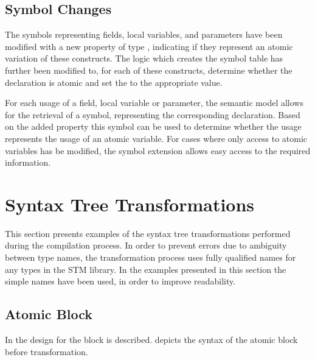 \subsection{Symbol Changes}
The symbols representing fields, local variables, and parameters have been modified with a new  property of type , indicating if they represent an atomic variation of these constructs. The logic which creates the symbol table has further been modified to, for each of these constructs, determine whether the declaration is atomic and set the  to the appropriate value.

For each usage of a field, local variable or parameter, the semantic model allows for the retrieval of a symbol, representing the corresponding declaration. Based on the added  property this symbol can be used to determine whether the usage represents the usage of an atomic variable. For cases where only access to atomic variables has be modified, the symbol extension allows easy access to the required information.

\section{Syntax Tree Transformations}
\label{sec:syntax_tree_transformations}
This section presents examples of the syntax tree transformations performed during the compilation process. In order to prevent errors due to ambiguity between type names, the transformation process uses fully qualified names\cite[p. 73]{csharp2013specificaiton}  for any types in the \ac{STM} library. In the examples presented in this section the simple names have been used, in order to improve readability. 

\subsection{Atomic Block}
In  the design for the  block is described.  depicts the syntax of the atomic block before transformation. 

